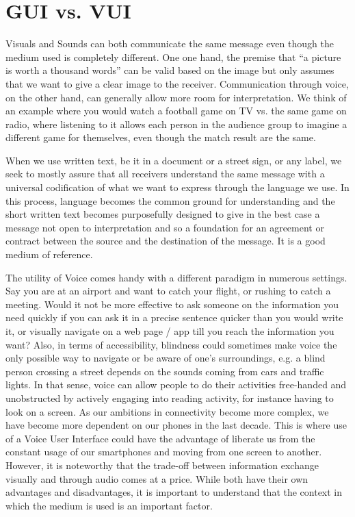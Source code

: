 \section{GUI vs. VUI} 

Visuals and Sounds can both communicate the same message even though the medium used is completely different. One one hand, the premise that ``a picture is worth a thousand words'' can be valid based on the image but only assumes that we want to give a clear image to the receiver. Communication through voice, on the other hand, can generally allow more room for interpretation. We think of an example where you would watch a football game on TV vs. the same game on radio, where listening to it allows each person in the audience group to imagine a different game for themselves, even though the match result are the same.



When we use written text, be it in a document or a street sign, or any label, we seek to mostly assure that all receivers understand the same message with a universal codification of what we want to express through the language we use. In this process, language becomes the common ground for understanding and the short written text becomes purposefully designed to give in the best case a message not open to interpretation and so a foundation for an agreement or contract between the source and the destination of the message. It is a good medium of reference. 

The utility of Voice comes handy with a different paradigm in numerous settings. 
Say you are at an airport and want to catch your flight, or rushing to catch a meeting. Would it not be more effective to ask someone on the information you need quickly if you can ask it in a precise sentence quicker than you would write it, or visually navigate on a web page / app till you reach the information you want? Also, in terms of accessibility, blindness could sometimes make voice the only possible way to navigate or be aware of one's surroundings, e.g. a blind person crossing a street depends on the sounds coming from cars and traffic lights.
In that sense, voice can allow people to do their activities free-handed and unobstructed by actively engaging into reading activity, for instance having to look on a screen.
As our ambitions in connectivity become more complex, we have become more dependent on our phones in the last decade.
This is where use of a Voice User Interface could have the advantage of liberate us from the constant usage of our smartphones and moving from one screen to another. 
However, it is noteworthy that the trade-off between information exchange visually and through audio comes at a price. While both have their own advantages and disadvantages, it is important to understand that the context in which the medium is used is an important factor.

